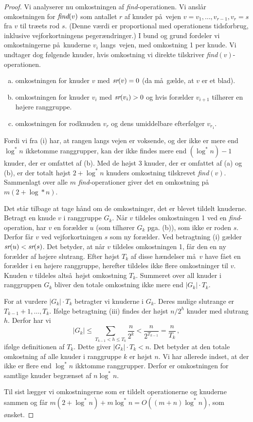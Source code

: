 \begin{proof}
  Vi analyserer nu omkostningen af \emph{find}-operationen.
  Vi anslår omkostningen for $\emph{find}(v)$ som antallet $r$ af knuder  på vejen $v=v_1,\ldots ,v_{r-1},v_r = s$ fra $v$ til træets rod $s$.
  (Denne værdi er proportional med operationens tidsforbrug, inklusive vejforkortningens pegerændringer.)
  I bund og grund fordeler vi omkostningerne på knuderne $v_i$ langs vejen, med omkostning 1 per knude.
  Vi undtager dog følgende knuder, hvis omkostning vi direkte tilskriver \emph{find}$(v)$-operationen.
  \begin{enumerate}[(a)]
    \item omkostningen for knuder $v$ med $\operatorname{\emph{sr}}(v)=0$ (da må gælde, at $v$ er et blad).
    \item omkostningen for knuder $v_i$ med $\operatorname{\emph{sr}}(v_i)>0$ og hvis forælder $v_{i+1}$ tilhører en højere ranggruppe.
    \item omkostningen for rodknuden $v_r$ og dens umiddelbare efterfølger $v_{r_1}$.
  \end{enumerate}
  Fordi vi fra (i) har, at rangen langs vejen er voksende, og der ikke er mere end $\log^*n$ ikketomme ranggrupper, kan der ikke findes mere end $(\log^*n)-1$ knuder, der er omfattet af (b).
  Med de højst 3 knuder, der er omfattet af (a) og (b), er der totalt højst $2+ \log^*n$ knuders omkostning tilskrevet \emph{find}$(v)$.
  Sammenlagt over alle $m$ \emph{find}-operationer giver det en omkostning på $m(2+ \log*n)$.

  Det står tilbage at tage hånd om de omkostninger, det er blevet tildelt knuderne.
  Betragt en knude $v$ i ranggruppe $G_k$.
  Når $v$ tildeles omkostningen 1 ved en \emph{find}-operation, har $v$ en forælder $u$ (som tilhører $G_k$ pga. (b)), som ikke er roden $s$.
  Derfor får $v$ ved vejforkortningen $s$ som ny forælder.
  Ved betragtning (i) gælder $\operatorname{\emph{sr}}(u)<\operatorname{\emph{sr}}(s)$.
  Det betyder, at når $v$ tildeles omkostningen 1, får den en ny forælder af højere slutrang.
  Efter højst $T_k$ af disse hændelser må $v$ have fået en forælder i en højere ranggruppe, herefter tildeles ikke flere omkostninger til $v$.
  Knuden $v$ tildeles altså højst omkostning $T_k$.
  Summeret over all knuder  i ranggruppen $G_k$ bliver den totale omkostning ikke mere end $|G_k|\cdot T_k$.

  For at vurdere $|G_k|\cdot T_k$ betragter vi knuderne i $G_k$.
  Deres mulige slutrange er $T_{k-1}+1,\ldots, T_k$.
  Ifølge betragtning (iii) findes der højst $n/2^h$ knuder med slutrang $h$.
  Derfor har vi
  \[ |G_k| \leq \sum_{T_{k-1}<h\leq T_k} \frac{n}{2^k} <
  \frac{n}{2^{T_{k-1}}} = \frac{n}{T_k}\,,\]
  ifølge definitionen af $T_k$.
  Dette giver $|G_k|\cdot T_k< n$.
  Det betyder at den totale omkostning af alle knuder i ranggruppe $k$ er højst $n$.
  Vi har allerede indset, at der ikke er flere end $\log^*n $ ikktomme ranggrupper.
  Derfor er omkostningen for samtlige knuder begrænset af $n\log^*n$.

  Til sist lægger vi omkostningerne som er tildelt operationerne og knuderne sammen og får $m(2+\log^*n) + m\log^* n = O((m+n)\log^*n)$, som ønsket.

\end{proof}












